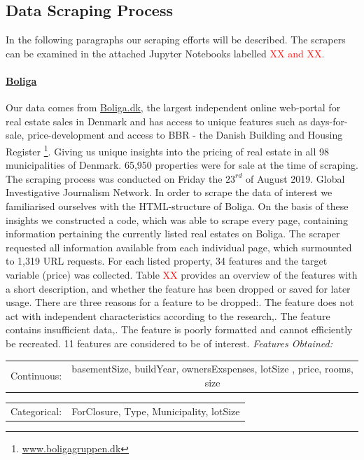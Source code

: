 \documentclass[12pt,a4paper]{article}
\begin{document}
\subsection{Data Scraping Process}
In the following paragraphs our scraping efforts will be described. The scrapers can be examined in the attached Jupyter Notebooks labelled \textcolor{red}{XX and XX.} 
\paragraph{\href{https://www.boliga.dk}{Boliga}\newline}
Our data comes from \href{https://www.boliga.dk}{Boliga.dk}, the largest independent online web-portal for real estate sales in Denmark and has access to unique features such as days-for-sale, price-development and access to BBR - the Danish Building and Housing Register \footnote{\href{https://www.boligagruppen.dk}{www.boligagruppen.dk}}. Giving us unique insights into the pricing of real estate in all 98 municipalities of Denmark. 65,950 properties were for sale at the time of scraping.\newline
The scraping process was conducted on Friday the $23^{rd}$ of August 2019. Global Investigative Journalism Network. In order to scrape the data of interest we familiarised ourselves with the HTML-structure of Boliga. On the basis of these insights we constructed a code, which was able to scrape every page, containing information pertaining the currently listed real estates on Boliga. The scraper requested all information available from each individual page, which surmounted to 1,319 URL requests. \newline
For each listed property, 34 features and the target variable (price) was collected. Table \textcolor{red}{XX} provides an overview of the features with a short description, and whether the feature has been dropped or saved for later usage. There are three reasons for a feature to be dropped:. The feature does not act with independent characteristics according to the research,. The feature contains insufficient data,. The feature is poorly formatted and cannot efficiently be recreated. 
11 features are considered to be of interest.
\vspace*{10px} \newline
\textit{Features Obtained:} \newline
\begin{tabular}{c c}
Continuous: & basementSize, buildYear, ownersExspenses, lotSize	, price, rooms, size  \\	
\end{tabular}\newline 
\begin{tabular}{c c}
Categorical: & ForClosure, Type, Municipality, lotSize	 \\	
\end{tabular}
\end{document}
